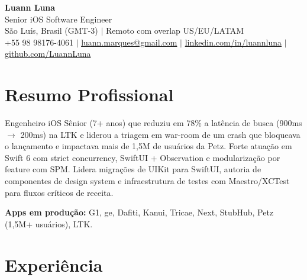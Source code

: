 \documentclass[11pt,letterpaper]{article}
\begin{document}
\begin{center}
    {\LARGE \textbf{Luann Luna}} \\
    \vspace{0.5em}
    Senior iOS Software Engineer \\
    \vspace{0.2em}
    São Luís, Brasil (GMT-3) $|$ Remoto com overlap US/EU/LATAM \\
    \vspace{0.3em}
    +55 98 98176-4061 $|$
    \href{mailto:luann.marques@gmail.com}{luann.marques@gmail.com} $|$
    \href{https://linkedin.com/in/luannluna}{linkedin.com/in/luannluna} $|$
    \href{https://github.com/LuannLuna}{github.com/LuannLuna}
\end{center}

\vspace{0.5em}

\section*{Resumo Profissional}
Engenheiro iOS Sênior (7+ anos) que reduziu em 78\% a latência de busca (900ms $\rightarrow$ 200ms) na LTK e liderou a triagem em war-room de um crash que bloqueava o lançamento e impactava mais de 1,5M de usuários da Petz. Forte atuação em Swift 6 com strict concurrency, SwiftUI + Observation e modularização por feature com SPM. Lidera migrações de UIKit para SwiftUI, autoria de componentes de design system e infraestrutura de testes com Maestro/XCTest para fluxos críticos de receita.

\vspace{0.35em}
\noindent\textbf{Apps em produção:} G1, ge, Dafiti, Kanui, Tricae, Next, StubHub, Petz (1,5M+ usuários), LTK.

\section*{Experiência}
\end{document}
